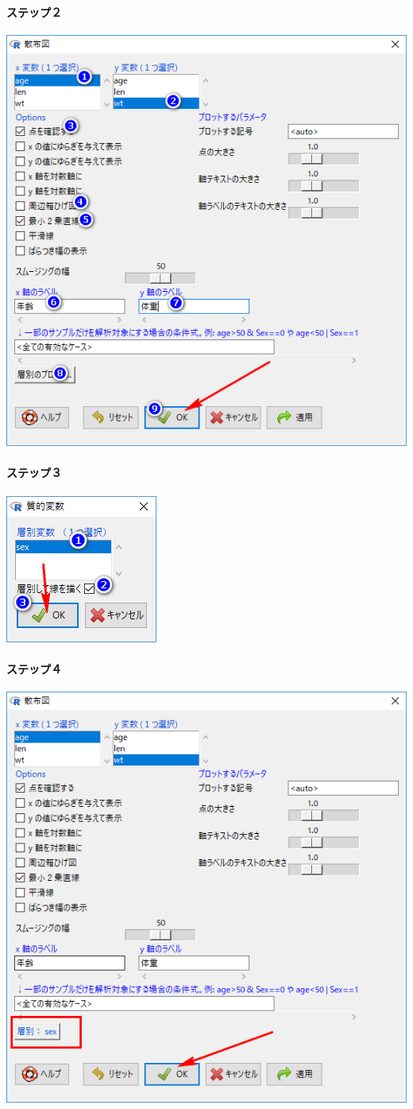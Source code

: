 \documentclass[11pt,]{problemset}
\let\oldparagraph\paragraph
\renewcommand{\paragraph}[1]{\oldparagraph{#1}\mbox{}}
\begin{document}
\paragraph{ステップ２}\label{-13}

\begin{center}\includegraphics[width=0.5\linewidth]{pic/scatter04} \end{center}

\paragraph{ステップ３}\label{-14}

\begin{center}\includegraphics[width=0.2\linewidth]{pic/scatter05} \end{center}

\paragraph{ステップ４}\label{-15}

\begin{center}\includegraphics[width=0.4\linewidth]{pic/scatter06} \end{center}
\end{document}
